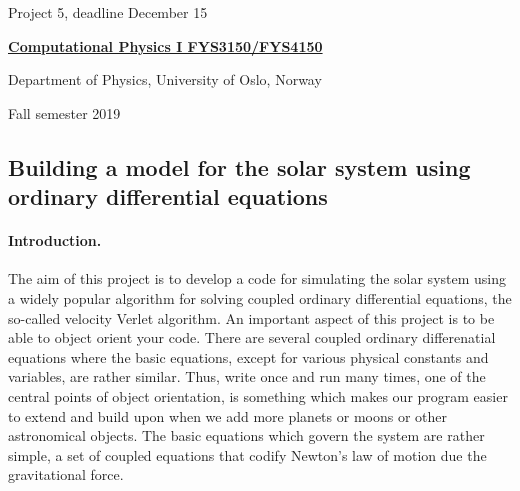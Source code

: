 \documentclass[%
oneside,                 %
final,                   %
10pt]{article}
\begin{document}

\newcommand{\exercisesection}[1]{\subsection*{#1}}






\thispagestyle{empty}

\begin{center}
{\LARGE\bf
\begin{spacing}{1.25}
Project 5, deadline  December 15
\end{spacing}
}
\end{center}


\begin{center}
{\bf \href{{http://www.uio.no/studier/emner/matnat/fys/FYS3150/index-eng.html}}{Computational Physics I FYS3150/FYS4150}}
\end{center}

    \begin{center}
\centerline{{\small Department of Physics, University of Oslo, Norway}}
\end{center}
    

\begin{center}
Fall semester 2019
\end{center}

\vspace{1cm}


\subsection{Building a model for the solar system using ordinary differential equations}

\paragraph{Introduction.}
The aim of this project is to develop a code for simulating the solar system using a widely popular algorithm for solving coupled ordinary differential equations, the so-called velocity Verlet
algorithm. An important aspect of this project is to be able to object orient your code. There are several coupled ordinary differenatial equations where the basic equations, except for various physical constants and variables, are rather similar. Thus, write once and run many times, one of the central points of object orientation, is something which makes our program easier to extend and build upon  when we add more planets or moons or other astronomical objects. The basic equations which govern the system are rather simple, a set of coupled equations that codify Newton's law of motion due  the gravitational force.   
\end{document}
